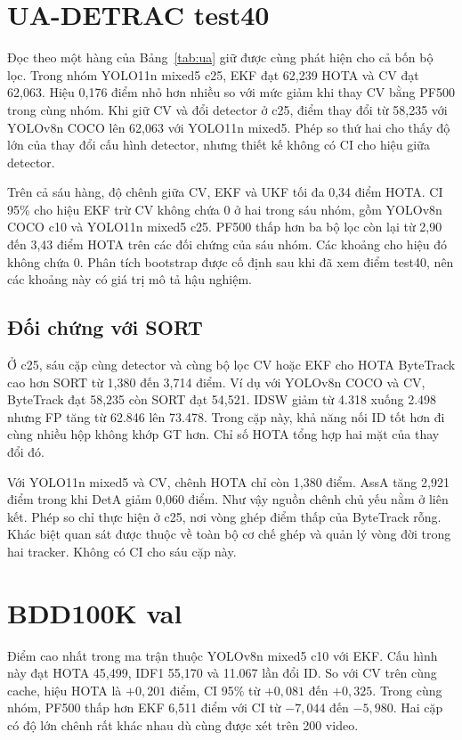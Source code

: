 \section{UA-DETRAC test40}

Đọc theo một hàng của Bảng~\ref{tab:ua} giữ được cùng phát hiện cho cả bốn bộ lọc. Trong nhóm YOLO11n mixed5 c25, EKF đạt 62,239 HOTA và CV đạt 62,063. Hiệu 0,176 điểm nhỏ hơn nhiều so với mức giảm khi thay CV bằng PF500 trong cùng nhóm. Khi giữ CV và đổi detector ở c25, điểm thay đổi từ 58,235 với YOLOv8n COCO lên 62,063 với YOLO11n mixed5. Phép so thứ hai cho thấy độ lớn của thay đổi cấu hình detector, nhưng thiết kế không có CI cho hiệu giữa detector.

Trên cả sáu hàng, độ chênh giữa CV, EKF và UKF tối đa 0,34 điểm HOTA. CI 95\% cho hiệu EKF trừ CV không chứa 0 ở hai trong sáu nhóm, gồm YOLOv8n COCO c10 và YOLO11n mixed5 c25. PF500 thấp hơn ba bộ lọc còn lại từ 2,90 đến 3,43 điểm HOTA trên các đối chứng của sáu nhóm. Các khoảng cho hiệu đó không chứa 0. Phân tích bootstrap được cố định sau khi đã xem điểm test40, nên các khoảng này có giá trị mô tả hậu nghiệm.

\subsection{Đối chứng với SORT}
Ở c25, sáu cặp cùng detector và cùng bộ lọc CV hoặc EKF cho HOTA ByteTrack cao hơn SORT từ 1,380 đến 3,714 điểm. Ví dụ với YOLOv8n COCO và CV, ByteTrack đạt 58,235 còn SORT đạt 54,521. IDSW giảm từ 4.318 xuống 2.498 nhưng FP tăng từ 62.846 lên 73.478. Trong cặp này, khả năng nối ID tốt hơn đi cùng nhiều hộp không khớp GT hơn. Chỉ số HOTA tổng hợp hai mặt của thay đổi đó.

Với YOLO11n mixed5 và CV, chênh HOTA chỉ còn 1,380 điểm. AssA tăng 2,921 điểm trong khi DetA giảm 0,060 điểm. Như vậy nguồn chênh chủ yếu nằm ở liên kết. Phép so chỉ thực hiện ở c25, nơi vòng ghép điểm thấp của ByteTrack rỗng. Khác biệt quan sát được thuộc về toàn bộ cơ chế ghép và quản lý vòng đời trong hai tracker. Không có CI cho sáu cặp này.

\section{BDD100K val}

Điểm cao nhất trong ma trận thuộc YOLOv8n mixed5 c10 với EKF. Cấu hình này đạt HOTA 45,499, IDF1 55,170 và 11.067 lần đổi ID. So với CV trên cùng cache, hiệu HOTA là $+0{,}201$ điểm, CI 95\% từ $+0{,}081$ đến $+0{,}325$. Trong cùng nhóm, PF500 thấp hơn EKF 6,511 điểm với CI từ $-7{,}044$ đến $-5{,}980$. Hai cặp có độ lớn chênh rất khác nhau dù cùng được xét trên 200 video.

